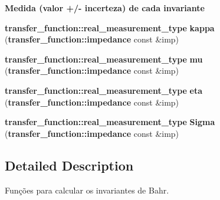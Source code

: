 \begin{Indent}{\bf Medida (valor +/- incerteza) de cada invariante}\par
\begin{CompactItemize}
\item 
{\bf transfer\_\-function::real\_\-measurement\_\-type} \textbf{kappa} ({\bf transfer\_\-function::impedance} const \&imp)\label{namespaceerro__manual_1_1base__xi__eta_1_1bahr__invariant_c1335a36fbaf22527d951342828c2ed1}

\item 
{\bf transfer\_\-function::real\_\-measurement\_\-type} \textbf{mu} ({\bf transfer\_\-function::impedance} const \&imp)\label{namespaceerro__manual_1_1base__xi__eta_1_1bahr__invariant_8c11d866f8b41420b6b2b3857499d126}

\item 
{\bf transfer\_\-function::real\_\-measurement\_\-type} \textbf{eta} ({\bf transfer\_\-function::impedance} const \&imp)\label{namespaceerro__manual_1_1base__xi__eta_1_1bahr__invariant_9bf4fa66929a8a45d30709359cc04d55}

\item 
{\bf transfer\_\-function::real\_\-measurement\_\-type} \textbf{Sigma} ({\bf transfer\_\-function::impedance} const \&imp)\label{namespaceerro__manual_1_1base__xi__eta_1_1bahr__invariant_8a3975f141f2b6548501ceeeb01f5132}

\end{CompactItemize}
\end{Indent}


\subsection{Detailed Description}
Funções para calcular os invariantes de Bahr. 